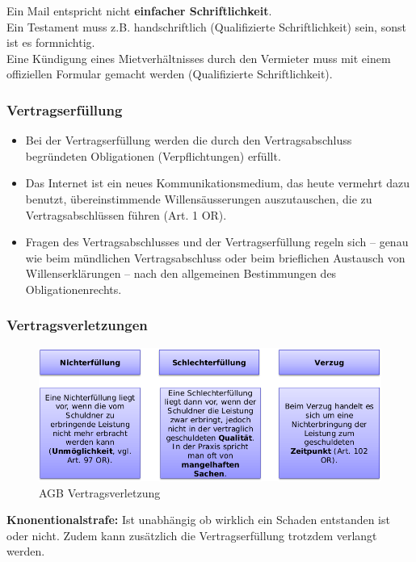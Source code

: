 Ein Mail entspricht nicht \textbf{einfacher Schriftlichkeit}.\\
Ein Testament muss z.B. handschriftlich (Qualifizierte Schriftlichkeit)
sein, sonst ist es formnichtig.\\
Eine Kündigung eines Mietverhältnisses durch den Vermieter muss mit
einem offiziellen Formular gemacht werden (Qualifizierte
Schriftlichkeit).

\subsubsection{Vertragserfüllung}

\begin{itemize}
\tightlist
\item Bei der Vertragserfüllung werden die durch den Vertragsabschluss
begründeten Obligationen (Verpflichtungen) erfüllt.
\item Das Internet ist ein neues Kommunikationsmedium, das heute vermehrt
dazu benutzt, übereinstimmende Willensäusserungen auszutauschen, die
zu Vertragsabschlüssen führen (Art. 1 OR).
\item Fragen des Vertragsabschlusses und der Vertragserfüllung regeln sich
-- genau wie beim mündlichen Vertragsabschluss oder beim brieflichen
Austausch von Willenserklärungen -- nach den allgemeinen Bestimmungen
des Obligationenrechts.
\end{itemize}

\subsubsection{Vertragsverletzungen}

\begin{figure}[H]
\centering
\includegraphics[width=.8\textwidth]{figures/agbVertragsverletzungen.png}
\caption{AGB Vertragsverletzung}
\end{figure}

\textbf{Knonentionalstrafe:} Ist unabhängig ob wirklich ein Schaden
entstanden ist oder nicht. Zudem kann zusätzlich die Vertragserfüllung
trotzdem verlangt werden.

